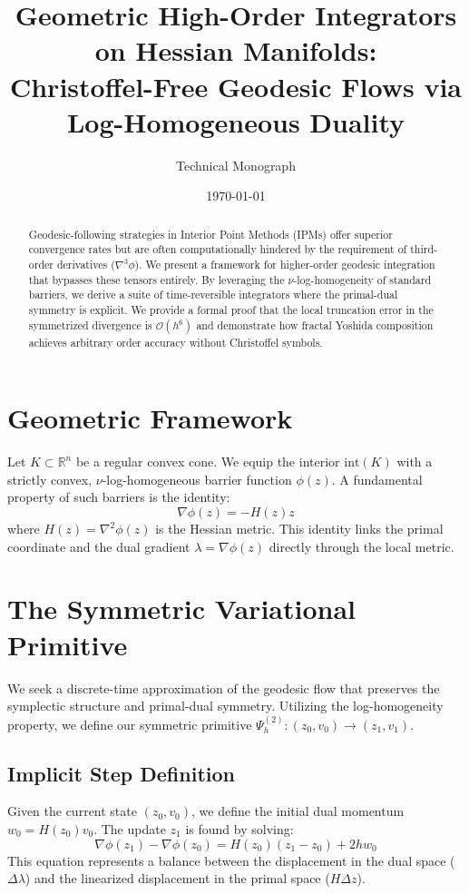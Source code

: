 \documentclass[11pt,a4paper]{article}
\title{\textbf{Geometric High-Order Integrators on Hessian Manifolds: \\ Christoffel-Free Geodesic Flows via Log-Homogeneous Duality}}
\author{Technical Monograph}
\date{\today}
\begin{document}
\maketitle

\begin{abstract}
Geodesic-following strategies in Interior Point Methods (IPMs) offer superior convergence rates but are often computationally hindered by the requirement of third-order derivatives ($\nabla^3 \phi$). We present a framework for higher-order geodesic integration that bypasses these tensors entirely. By leveraging the $\nu$-log-homogeneity of standard barriers, we derive a suite of time-reversible integrators where the primal-dual symmetry is explicit. We provide a formal proof that the local truncation error in the symmetrized divergence is $\mathcal{O}(h^6)$ and demonstrate how fractal Yoshida composition achieves arbitrary order accuracy without Christoffel symbols.
\end{abstract}

\section{Geometric Framework}
Let $K \subset \mathbb{R}^n$ be a regular convex cone. We equip the interior $\text{int}(K)$ with a strictly convex, $\nu$-log-homogeneous barrier function $\phi(z)$. A fundamental property of such barriers is the identity:
\begin{equation}
    \nabla \phi(z) = -H(z)z
\end{equation}
where $H(z) = \nabla^2 \phi(z)$ is the Hessian metric. This identity links the primal coordinate and the dual gradient $\lambda = \nabla \phi(z)$ directly through the local metric.

\section{The Symmetric Variational Primitive}
We seek a discrete-time approximation of the geodesic flow that preserves the symplectic structure and primal-dual symmetry. Utilizing the log-homogeneity property, we define our symmetric primitive $\Psi_h^{(2)}: (z_0, v_0) \to (z_1, v_1)$.

\subsection{Implicit Step Definition}
Given the current state $(z_0, v_0)$, we define the initial dual momentum $w_0 = H(z_0)v_0$. The update $z_1$ is found by solving:
\begin{equation}
    \nabla \phi(z_1) - \nabla \phi(z_0) = H(z_0)(z_1 - z_0) + 2h w_0
\end{equation}
This equation represents a balance between the displacement in the dual space ($\Delta \lambda$) and the linearized displacement in the primal space ($H \Delta z$). 
\end{document}
